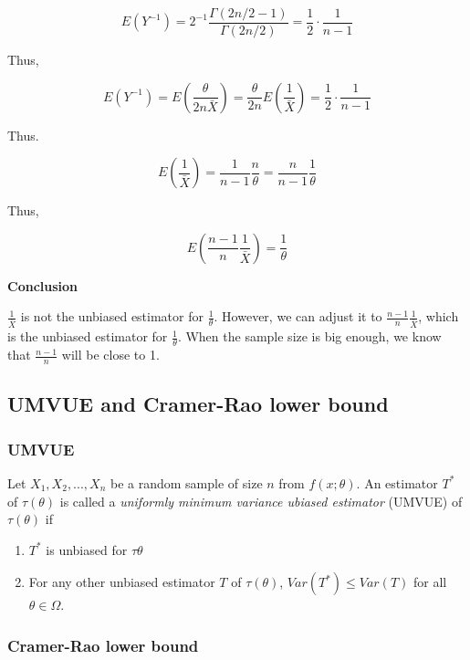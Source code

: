 \documentclass[
]{book}
\begin{document}
\[E(Y^{-1})=2^{-1} \frac{\Gamma(2n/2-1)}{\Gamma(2n/2)}=\frac{1}{2}\cdot \frac{1}{n-1}\]

Thus,

\[E(Y^{-1})=E(\frac{\theta}{2n \bar{X}})=\frac{\theta}{2n}E(\frac{1}{\bar{X}})=\frac{1}{2}\cdot \frac{1}{n-1}\]

Thus.

\[E(\frac{1}{\bar{X}})=\frac{1}{n-1}\frac{n}{\theta}=\frac{n}{n-1}\frac{1}{\theta}\]

Thus,

\[E(\frac{n-1}{n} \frac{1}{\bar{X}})=\frac{1}{\theta}\]

\textbf{Conclusion}

\(\frac{1}{\bar{X}}\) is not the unbiased estimator for \(\frac{1}{\theta}\). However, we can adjust it to \(\frac{n-1}{n} \frac{1}{\bar{X}}\), which is the unbiased estimator for \(\frac{1}{\theta}\). When the sample size is big enough, we know that \(\frac{n-1}{n}\) will be close to 1.

\hypertarget{umvue-and-cramer-rao-lower-bound}{%
\subsection{UMVUE and Cramer-Rao lower bound}\label{umvue-and-cramer-rao-lower-bound}}

\hypertarget{umvue}{%
\subsubsection{UMVUE}\label{umvue}}

Let \(X_1, X_2,...,X_n\) be a random sample of size \(n\) from \(f(x; \theta)\). An estimator \(T^*\) of \(\tau (\theta)\) is called a \emph{uniformly minimum variance ubiased estimator} (UMVUE) of \(\tau(\theta)\) if

\begin{enumerate}
\def\labelenumi{\arabic{enumi}.}
\item
  \(T^*\) is unbiased for \(\tau{\theta}\)
\item
  For any other unbiased estimator \(T\) of \(\tau(\theta)\), \(Var(T^*) \leq Var(T)\) for all \(\theta \in \Omega\).
\end{enumerate}

\hypertarget{cramer-rao-lower-bound}{%
\subsubsection{Cramer-Rao lower bound}\label{cramer-rao-lower-bound}}
\end{document}
